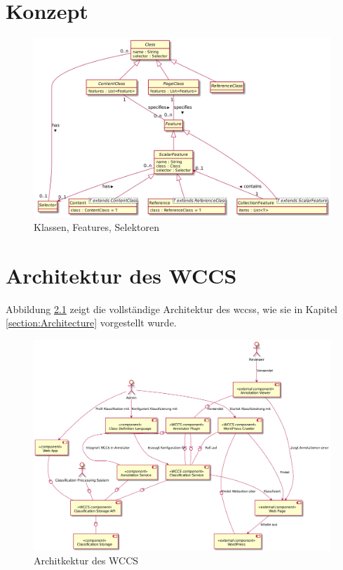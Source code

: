 \chapter{Konzept}
    \begin{figure}[htb]
        \centering
        \includegraphics[width=\textwidth]{../resources/concept/classes-features-selectors.png}
        \caption{Klassen, Features, Selektoren}
        \label{image:conceptClassesFeaturesSelectors}
    \end{figure}

\chapter{Architektur des WCCS}
    Abbildung \ref{image:wccsExternalArchitecture} zeigt die vollständige Architektur des \glspl{wccs},
    wie sie in Kapitel \ref{section:Architecture} vorgestellt wurde.

    \begin{figure}[htb]
        \centering
        \includegraphics[width=\textwidth]{../resources/architecture/complete_architecture.png}
        \caption{Architkektur des WCCS}
        \label{image:wccsExternalArchitecture}
    \end{figure}


